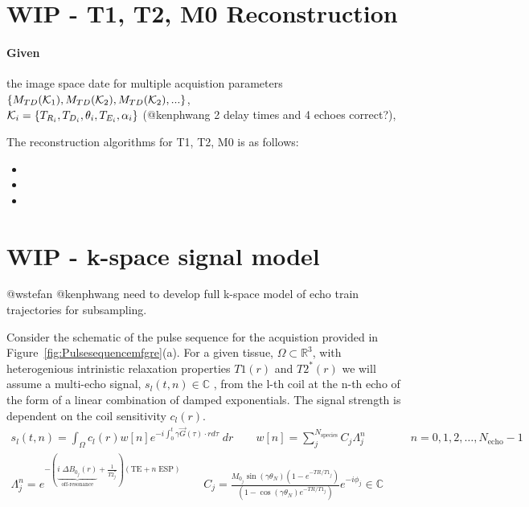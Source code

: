 \documentclass{article}         %
\theoremstyle{definition}
\theoremstyle{remark}
\begin{document}
\section{WIP - T1, T2, M0 Reconstruction}
\paragraph{Given}
the image space date for  multiple  acquistion parameters 
$\{ M_{TD}(\mathcal{K}_1),M_{TD}(\mathcal{K}_2), M_{TD}(\mathcal{K}_2),... \}$,  \\
 $\mathcal{K}_i=\{T_{R_i},T_{D_i},\theta_i,T_{E_i},\alpha_i\}$ 
{\color{red}(@kenphwang 2 delay times and 4 echoes correct?)},

The reconstruction algorithms for T1, T2, M0 is as follows:
\begin{itemize}
\item 
\item 
\item 
\end{itemize}

\section{WIP - k-space signal model}


{\color{red} @wstefan @kenphwang need to develop full k-space model of echo train trajectories for subsampling.}

Consider the schematic of the pulse sequence for the  acquistion provided in
Figure~\ref{fig:Pulsesequencemfgre}(a).
For a  given tissue, $\Omega \subset \mathbb{R}^3$,
with heterogenious intrinistic relaxation properties $T1(r)$ and $T2^*(r)$
we will assume a multi-echo signal, $s_l(t,n)\in\mathbb{C}$ ,
from the l-th coil at the n-th echo 
of the form of a linear combination of damped exponentials. 
The signal strength is dependent on the coil sensitivity $c_l(r)$.
\begin{equation}
\label{multiechosignalmodel}
\begin{split}
 s_l(t,n) = \int_\Omega c_l(r)  w[n] e^{-i \int_0^t \gamma \vec{G}(\tau)\cdot r d \tau} \; dr
\qquad
 w[n]  = \sum_j^{N_\text{species}} 
 C_j \Lambda_j^n 
  \qquad  \qquad n = 0,1,2,\dots,N_\text{echo}-1
\\
\Lambda_j^n  = e^{-\left( 
\underbrace{i\; \Delta B_{0_j}(r) }_\text{off-resonance} 
+
\frac{1}{T2^*_j} \right) \left( \text{TE} + n \; \text{ESP}\right) } 
\quad  \quad
C_j = \frac{M_{0_j} \sin \left(\gamma \theta_N \right)\left( 1- e^{-TR/T1_j}\right)}{\left( 1- \cos \left(\gamma \theta_N \right) e^{-TR/T1_j}\right)}
e^{-i  \phi_j} 
\in  \mathbb{C} 
\end{split}
\end{equation}
\end{document}
